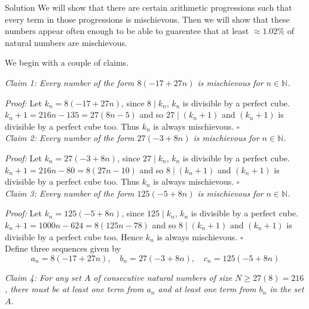 \documentclass{article}
\begin{document}
\begin{solution}{Solution}
We will show that there are certain arithmetic progressions such that
every term in those progressions is mischievous. Then we will show that
these numbers appear often enough to be able to guarentee that at least
$\approx 1.02 \%$ of natural numbers are mischievous. \vspace{0.2cm}

We begin with a couple of claims.
\vspace{0.2cm}

\textit{Claim 1: Every number of the form $8(-17 + 27n)$ is mischievous
for $n \in \mathbb{N}$.}
\vspace{0.2cm}

\textit{Proof:} Let $k_n = 8(-17 + 27n)$, since $8 \mid k_n$, $k_n$ is
divisible by a perfect cube. $k_n + 1 = 216n - 135 = 27(8n - 5)$ and so
$27 \mid (k_n + 1)$ and $(k_n + 1)$ is divisible by a perfect cube too.
Thus $k_n$ is always mischievous. $\square$
\\

\textit{Claim 2: Every number of the form $27(-3 + 8n)$ is mischievous
for $n \in \mathbb{N}$.}
\vspace{0.2cm}

\textit{Proof:} Let $k_n = 27(-3 + 8n)$, since $27 \mid k_n$, $k_n$ is
divisible by a perfect cube. $k_n + 1 = 216n - 80 = 8(27n - 10)$ and so
$8 \mid (k_n + 1)$ and $(k_n + 1)$ is divisible by a perfect cube too.
Thus $k_n$ is always mischievous. $\square$
\\

\textit{Claim 3: Every number of the form $125(-5 + 8n)$ is mischievous
for $n \in \mathbb{N}$.}
\vspace{0.2cm}

\textit{Proof:} Let $k_n = 125(-5 + 8n)$, since $125 \mid k_n$,
$k_n$ is divisible by a perfect cube. $k_n + 1 = 1000n - 624 =
8(125n - 78)$ and so $8 \mid (k_n + 1)$ and $(k_n + 1)$ is divisible
by a perfect cube too. Hence $k_n$ is always mischievous. $\square$ \\

\bigskip
Define three sequences given by
$$
a_n = 8(-17 + 27n), \quad b_n = 27(-3 + 8n), \quad c_n = 125(-5 + 8n)
$$
\bigskip

\textit{Claim 4: For any set $A$ of consecutive natural numbers of size
$N \geq 27(8) = 216$, there must be at least one term from $a_n$ and
at least one term from $b_n$ in the set $A$.} \vspace{0.2cm}


\end{solution}
\end{document}
